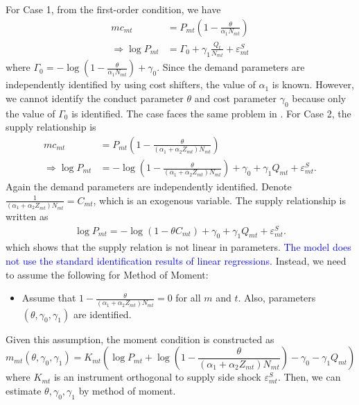 \documentclass[11pt, a4paper]{article}
\begin{document}
For Case 1, from the first-order condition, we have
    \begin{align*}
        mc_{mt}& = P_{mt}\left( 1-\frac{\theta}{\alpha_1 N_{mt}} \right)\\
        \Longrightarrow\log P_{mt}  &=  \Gamma_0 + \gamma_1 \frac{Q_t}{N_{mt}} +\varepsilon_{mt}^{S} 
    \end{align*}
    where $\Gamma_0 = -\log \left( 1-\frac{\theta}{\alpha_1 N_{mt}} \right) +\gamma_0$.
    Since the demand parameters are independently identified by using cost shifters, the value of $\alpha_1$ is known. However, we cannot identify the conduct parameter $\theta$ and cost parameter $\gamma_0$ because only the value of $\Gamma_0$ is identified. The case faces the same problem in \cite{bresnahan1982oligopoly}.
    For Case 2, the supply relationship is 
    \begin{align*}
            mc_{mt}& = P_{mt}\left(  1 - \frac{\theta}{(\alpha_1+\alpha_2 Z_{mt})N_{mt}} \right)\\
            \Longrightarrow \log P_{mt}& = -\log \left(  1 - \frac{\theta}{(\alpha_1+\alpha_2 Z_{mt})N_{mt}} \right) +\gamma_0 + \gamma_1 Q_{mt} + \varepsilon_{mt}^{S}. 
    \end{align*}
    Again the demand parameters are independently identified. Denote $\frac{1}{(\alpha_1+\alpha_2 Z_{mt})N_{mt}} = C_{mt}$, which is an exogenous variable. The supply relationship is written as 
    \begin{align*}
        \log P_{mt} = -\log \left(  1 - \theta C_{mt} \right) +\gamma_0 + \gamma_1 Q_{mt} + \varepsilon_{mt}^{S}. 
    \end{align*}
    which shows that the supply relation is not linear in parameters. \textcolor{blue}{The model does not use the standard identification results of linear regressions.} Instead, we need to assume the following for Method of Moment:
    \begin{itemize}
        \item Assume that $1 - \frac{\theta}{(\alpha_1+\alpha_2 Z_{mt})N_{mt}}=0$ for all $m$ and $t$. Also, parameters $(\theta,\gamma_0,\gamma_1)$ are identified.
    \end{itemize}
    Given this assumption, the moment condition is constructed as $$m_{mt}(\theta,\gamma_0,\gamma_1)=K_{mt}\left(\log P_{mt} +\log \left(  1 - \frac{\theta}{(\alpha_1+\alpha_2 Z_{mt})N_{mt}} \right) -\gamma_0 - \gamma_1 Q_{mt}\right)$$ where $K_{mt}$ is an instrument orthogonal to supply side shock $\varepsilon_{mt}^{S}$. Then, we can estimate $\theta,\gamma_0,\gamma_1$ by method of moment.
\end{document}

